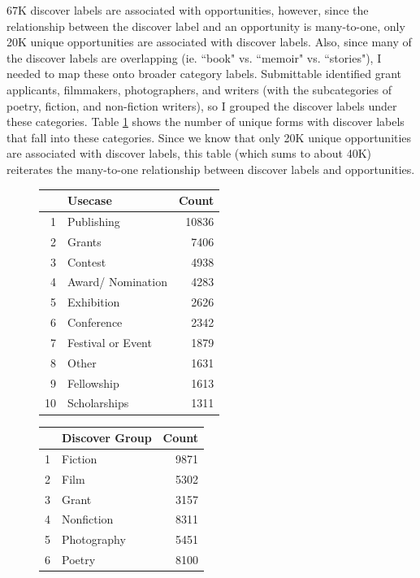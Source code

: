 \documentclass[]{report}   %
\begin{document}
67K discover labels are associated with opportunities, however, since the relationship between the discover label and an opportunity is many-to-one, only 20K unique opportunities are associated with discover labels. Also, since many of the discover labels are overlapping (ie. ``book" vs. ``memoir" vs. ``stories"), I needed to map these onto broader category labels. Submittable identified grant applicants, filmmakers, photographers, and writers (with the subcategories of poetry, fiction, and non-fiction writers), so I grouped the discover labels under these categories. Table \ref{table:discovergroup} shows the number of unique forms with discover labels that fall into these categories. Since we know that only 20K unique opportunities are associated with discover labels, this table (which sums to about 40K) reiterates the many-to-one relationship between discover labels and opportunities.
\begin{figure}[h]
\begin{minipage}{0.45\textwidth}
\centering
{}
\label{table:topusecase}
\begin{tabular}{rlr}
  \hline
 & Usecase & Count \\ 
  \hline
1 & Publishing & 10836 \\ 
  2 & Grants & 7406 \\ 
  3 & Contest & 4938 \\ 
  4 & Award/ Nomination & 4283 \\ 
  5 & Exhibition & 2626 \\ 
  6 & Conference & 2342 \\ 
  7 & Festival or Event & 1879 \\ 
  8 & Other & 1631 \\ 
  9 & Fellowship & 1613 \\ 
  10 & Scholarships & 1311 \\ 
   \hline
\end{tabular}
\end{minipage}
\hfill
\begin{minipage}{0.45\textwidth}
     \centering
{}
\label{table:discovergroup}
\centering
\begin{tabular}{rlr}
  \hline
 & Discover Group & Count \\ 
  \hline
1 & Fiction & 9871 \\ 
  2 & Film & 5302 \\ 
  3 & Grant & 3157 \\ 
  4 & Nonfiction & 8311 \\ 
  5 & Photography & 5451 \\ 
  6 & Poetry & 8100 \\ 
   \hline
\end{tabular}
    \end{minipage}
\end{figure}
\FloatBarrier
\end{document}
